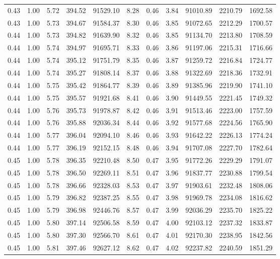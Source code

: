 \begin{table}[!ht]
\begin{tabular}{rrrrrrrrrrr}
0.43 & 1.00 & 5.72 & 394.52 & 91529.10 & 8.28 & 0.46 & 3.84 & 91010.89 & 2210.79 & 1692.58 \\
0.43 & 1.00 & 5.73 & 394.67 & 91584.37 & 8.30 & 0.46 & 3.85 & 91072.65 & 2212.29 & 1700.57 \\
0.44 & 1.00 & 5.73 & 394.82 & 91639.90 & 8.32 & 0.46 & 3.85 & 91134.70 & 2213.80 & 1708.59 \\
0.44 & 1.00 & 5.74 & 394.97 & 91695.71 & 8.33 & 0.46 & 3.86 & 91197.06 & 2215.31 & 1716.66 \\
0.44 & 1.00 & 5.74 & 395.12 & 91751.79 & 8.35 & 0.46 & 3.87 & 91259.72 & 2216.84 & 1724.77 \\
0.44 & 1.00 & 5.74 & 395.27 & 91808.14 & 8.37 & 0.46 & 3.88 & 91322.69 & 2218.36 & 1732.91 \\
0.44 & 1.00 & 5.75 & 395.42 & 91864.77 & 8.39 & 0.46 & 3.89 & 91385.96 & 2219.90 & 1741.10 \\
0.44 & 1.00 & 5.75 & 395.57 & 91921.68 & 8.41 & 0.46 & 3.90 & 91449.55 & 2221.45 & 1749.32 \\
0.44 & 1.00 & 5.76 & 395.73 & 91978.87 & 8.42 & 0.46 & 3.91 & 91513.46 & 2223.00 & 1757.59 \\
0.44 & 1.00 & 5.76 & 395.88 & 92036.34 & 8.44 & 0.46 & 3.92 & 91577.68 & 2224.56 & 1765.90 \\
0.44 & 1.00 & 5.77 & 396.04 & 92094.10 & 8.46 & 0.46 & 3.93 & 91642.22 & 2226.13 & 1774.24 \\
0.44 & 1.00 & 5.77 & 396.19 & 92152.15 & 8.48 & 0.46 & 3.94 & 91707.08 & 2227.70 & 1782.64 \\
0.45 & 1.00 & 5.78 & 396.35 & 92210.48 & 8.50 & 0.47 & 3.95 & 91772.26 & 2229.29 & 1791.07 \\
0.45 & 1.00 & 5.78 & 396.50 & 92269.11 & 8.51 & 0.47 & 3.96 & 91837.77 & 2230.88 & 1799.54 \\
0.45 & 1.00 & 5.78 & 396.66 & 92328.03 & 8.53 & 0.47 & 3.97 & 91903.61 & 2232.48 & 1808.06 \\
0.45 & 1.00 & 5.79 & 396.82 & 92387.25 & 8.55 & 0.47 & 3.98 & 91969.78 & 2234.08 & 1816.62 \\
0.45 & 1.00 & 5.79 & 396.98 & 92446.76 & 8.57 & 0.47 & 3.99 & 92036.29 & 2235.70 & 1825.22 \\
0.45 & 1.00 & 5.80 & 397.14 & 92506.58 & 8.59 & 0.47 & 4.00 & 92103.12 & 2237.32 & 1833.87 \\
0.45 & 1.00 & 5.80 & 397.30 & 92566.70 & 8.61 & 0.47 & 4.01 & 92170.30 & 2238.95 & 1842.56 \\
0.45 & 1.00 & 5.81 & 397.46 & 92627.12 & 8.62 & 0.47 & 4.02 & 92237.82 & 2240.59 & 1851.29 \\

\end{tabular}
\end{table}
